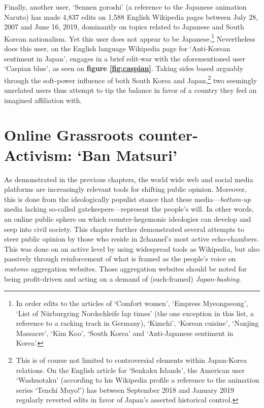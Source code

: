 \documentclass[10pt,british,A4paper,oneside]{memoir}
\begin{document}
Finally, another user, `Sennen goroshi' (a reference to the Japanese
animation Naruto) has made 4,837 edits on 1,588 English Wikipedia pages
between July 28, 2007 and June 16, 2019, dominantly on topics related to
Japanese and South Korean nationalism. Yet this user does not appear to
be Japanese.\footnote{In order edits to the articles of `Comfort women',
  `Empress Myeongseong', `List of Nürburgring Nordschleife lap times'
  (the one exception in this list, a reference to a racking track in
  Germany), `Kimchi', `Korean cuisine', `Nanjing Massacre', `Kim Koo',
  `South Korea' and `Anti-Japanese sentiment in Korea'.} Nevertheless
does this user, on the English language Wikipedia page for `Anti-Korean
sentiment in Japan', engages in a brief edit-war with the aforementioned
user `Caspian blue', as seen on \textbf{figure \ref{fig:caspian}}.
Taking sides based arguably through the soft-power influence of both
South Korea and Japan,\footnote{This is of course not limited to
  controversial elements within Japan-Korea relations. On the English
  article for `Senkaku Islands', the American user `Washuotaku'
  (according to his Wikipedia profile a reference to the animation
  series `Tenchi Muyo!') has between September 2018 and January 2019
  regularly reverted edits in favor of Japan's asserted historical
  control.} two seemingly unrelated users thus attempt to tip the
balance in favor of a country they feel an imagined affiliation with.

\section{\texorpdfstring{Online Grassroots counter-Activism: `Ban
Matsuri'}{Online Grassroots counter-Activism: Ban Matsuri}}\label{online-grassroots-counter-activism-ban-matsuri}

As demonstrated in the previous chapters, the world wide web and social
media platforms are increasingly relevant tools for shifting public
opinion. Moreover, this is done from the ideologically populist stance
that these media---\emph{bottom-up} media lacking so-called
gatekeepers---represent the people's will. In other words, an online
public sphere on which counter-hegemonic ideologies can develop and seep
into civil society. This chapter further demonstrated several attempts
to steer public opinion by those who reside in 2channel's most active
echo-chambers. This was done on an active level by using widespread
tools as Wikipedia, but also passively through reinforcement of what is
framed as the people's voice on \emph{matome} aggregation websites.
Those aggregation websites should be noted for being profit-driven and
acting on a demand of (such-framed) \emph{Japan-bashing}.
\end{document}
